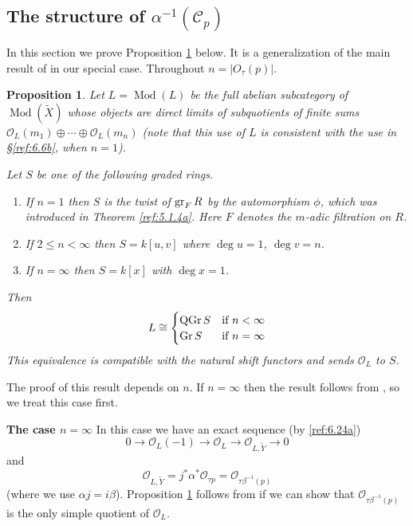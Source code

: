 \documentclass{amsproc}
\def\Cscr{{\mathcal C}}
\def\Oscr{{\mathcal O}}
\def\gr{\mathop{\text{gr}}}
\def\Gr{\mathop{\text{Gr}}}
\def\gr{\operatorname {gr}}
\def\gr{\operatorname {gr}}
\def\Qch{\operatorname {Mod}}
\def\r{\rightarrow}
\let\oldtext\text
\def\text#1{\oldtext{\upshape #1}}
\DeclareMathOperator{\QGr}{QGr}
\newtheorem{propositions}[lemmas]{Proposition}
\theoremstyle{definition}
\theoremstyle{remark}
\numberwithin{equation}{section}
\numberwithin{table}{section}
\numberwithin{figure}{section}
\def\gr{\mathop{\text{gr}}}
\def\Gr{\mathop{\text{Gr}}}
\begin{document}
\subsection{The structure of $\alpha^{-1}(\Cscr_p)$}
\label{ref:6.7b}
In this section we prove Proposition \ref{ref:6.7.1a} below.
It is a generalization of the main result of
\cite{SmithZhang} in our special case. Throughout $n=|O_\tau (p)|$. 
\begin{propositions}
\label{ref:6.7.1a} 
Let $L=\Qch(L)$ be the full abelian subcategory of $\Qch(\tilde{X})$
whose objects are
direct limits of subquotients of finite sums $\Oscr_L(m_1)\oplus\cdots
\oplus \Oscr_L(m_n)$ (note that this use of $L$ is consistent with the use in
\S \ref{ref:6.6b}, when $n=1$).

Let $S$ be one of the following graded rings.
\begin{enumerate}
\item
If $n=1$ then $S$ is the twist \cite{ATV2,Zhang} of $\gr_F R$ by the 
automorphism $\phi$, which was introduced in Theorem \ref{ref:5.1.4a}. Here $F$
denotes the $m$-adic filtration on $R$.
\item 
If $2\le n<\infty$ then $S=k[u,v]$ where $\deg u=1$, $\deg v=n$.
\item If $n=\infty$ then $S=k[x]$ with $\deg x=1$.
\end{enumerate}
Then
\[
L\cong 
\begin{cases}
\QGr S &\text{if $n<\infty$}\\
\Gr S &\text{if $n=\infty$}
\end{cases}
\]
This equivalence is compatible with the natural shift functors and sends
$\Oscr_L$ to $S$.
\end{propositions}
The proof of this result depends on $n$. If $n=\infty$ then the result
follows from \cite{SmithZhang}, so we treat this case first.

\medskip

\noindent
\textbf{The case { $n=\infty$}} In this case we have
an exact sequence (by \eqref{ref:6.24a})
\[
0\r \Oscr_L(-1)\r \Oscr_L\r \Oscr_{L,\tilde{Y}}\r 0
\]
and
\begin{equation}
\label{ref:6.36a}
\Oscr_{L,\tilde{Y}}=j^\ast\alpha^\ast\Oscr_{\tau p}= \Oscr_{\tau
  \beta^{-1}(p)}
\end{equation}
(where we use $\alpha j=i\beta$). Proposition 
\ref{ref:6.7.1a}  follows
from \cite{SmithZhang} if we can show that $\Oscr_{\tau \beta^{-1}(p)}$ is the
only simple quotient of $\Oscr_L$.
\end{document}
